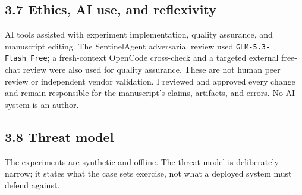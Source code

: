 \documentclass[
  10pt,
]{article}
\let\origtexttt\texttt
\renewcommand{\texttt}[1]{{\upshape\origtexttt{#1}}}
\renewcommand{\_}{\allowbreak\origunderscore}
\begin{document}
\subsection{3.7 Ethics, AI use, and
reflexivity}\label{ethics-ai-use-and-reflexivity}

AI tools assisted with experiment implementation, quality assurance, and
manuscript editing. The SentinelAgent adversarial review used
\texttt{GLM-5.3-Flash\ Free}; a fresh-context OpenCode cross-check and a
targeted external free-chat review were also used for quality assurance.
These are not human peer review or independent vendor validation. I
reviewed and approved every change and remain responsible for the
manuscript's claims, artifacts, and errors. No AI system is an author.

\subsection{3.8 Threat model}\label{threat-model}

The experiments are synthetic and offline. The threat model is
deliberately narrow; it states what the case sets exercise, not what a
deployed system must defend against.
\end{document}
